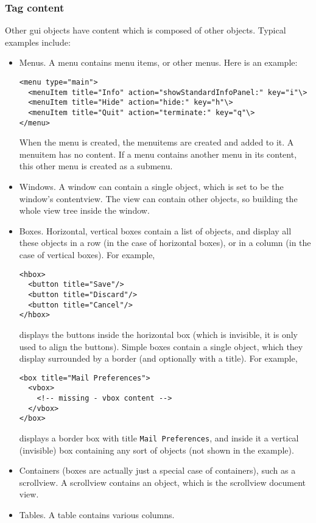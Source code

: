 \subsubsection{Tag content}
Other gui objects have content which is composed of other objects.
Typical examples include:
\begin{itemize}
\item Menus.  A menu contains menu items, or other menus.  Here is 
an example:
\begin{verbatim}
<menu type="main">
  <menuItem title="Info" action="showStandardInfoPanel:" key="i"\>
  <menuItem title="Hide" action="hide:" key="h"\>
  <menuItem title="Quit" action="terminate:" key="q"\>
</menu>
\end{verbatim}
When the menu is created, the menuitems are created and added to it.
A menuitem has no content.  If a menu contains another menu in its
content, this other menu is created as a submenu.
\item Windows.  A window can contain a single object, which is set to be
the window's contentview.  The view can contain other objects, so 
building the whole view tree inside the window.
\item Boxes.  Horizontal, vertical boxes contain a list of objects, and display
all these objects in a row (in the case of horizontal boxes), or in a column
(in the case of vertical boxes).  For example,
\begin{verbatim}
<hbox>
  <button title="Save"/>
  <button title="Discard"/>
  <button title="Cancel"/>
</hbox>
\end{verbatim}
displays the buttons inside the horizontal box (which is invisible, it
is only used to align the buttons).  Simple boxes contain a single
object, which they display surrounded by a border (and optionally with
a title).  For example,
\begin{verbatim}
<box title="Mail Preferences">
  <vbox>
    <!-- missing - vbox content -->
  </vbox>
</box>
\end{verbatim}
displays a border box with title \texttt{Mail Preferences}, and inside it 
a vertical (invisible) box containing any sort of objects (not shown in the
example).
\item Containers (boxes are actually just a special case of containers), such
as a scrollview.  A scrollview contains an object, which is the
scrollview document view.
\item Tables.  A table contains various columns.
\end{itemize}

